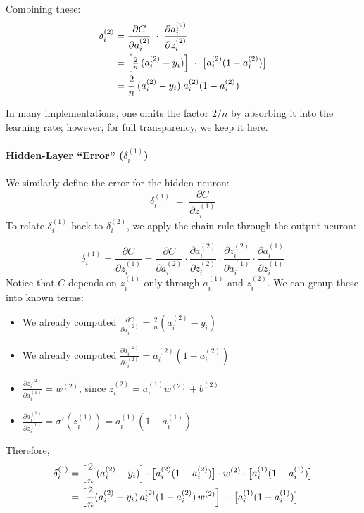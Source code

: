 \documentclass{article}
\begin{document}
\noindent Combining these:
\begin{align}
    \delta_i^{(2)}
    &= \frac{\partial C}{\partial a_i^{(2)}} \;\cdot\; \frac{\partial a_i^{(2)}}{\partial z_i^{(2)}} \\
    &= \Bigl[\tfrac{2}{n}\,(a_i^{(2)} - y_i)\Bigr]\ \cdot\ \bigl[a_i^{(2)}(1 - a_i^{(2)})\bigr] \\
    &= \frac{2}{n}\,(a_i^{(2)} - y_i)\;a_i^{(2)}(1 - a_i^{(2)})
    \label{eq:delta2}
\end{align}

\noindent In many implementations, one omits the factor \(2/n\) by absorbing it into the learning rate; however, for full transparency, we keep it here.

\paragraph{Hidden-Layer ``Error'' (\(\delta_i^{(1)}\))\\}
We similarly define the error for the hidden neuron:
\[
    \delta_i^{(1)} \;=\; \frac{\partial C}{\partial z_i^{(1)}}
\]
To relate \(\delta_i^{(1)}\) back to \(\delta_i^{(2)}\), we apply the chain rule through the output neuron:

\[
    \delta_i^{(1)}
    = \frac{\partial C}{\partial z_i^{(1)}}
    = \frac{\partial C}{\partial a_i^{(2)}} \cdot \frac{\partial a_i^{(2)}}{\partial z_i^{(2)}} \cdot \frac{\partial z_i^{(2)}}{\partial a_i^{(1)}} \cdot \frac{\partial a_i^{(1)}}{\partial z_i^{(1)}}
\]
Notice that \(C\) depends on \(z_i^{(1)}\) only through \(a_i^{(1)}\) and \(z_i^{(2)}\).  We can group these into known terms:

\begin{itemize}
    \item We already computed \(\displaystyle \frac{\partial C}{\partial a_i^{(2)}} = \frac{2}{n}(a_i^{(2)} - y_i)\)
    \item We already computed \(\displaystyle \frac{\partial a_i^{(2)}}{\partial z_i^{(2)}} = a_i^{(2)}(1 - a_i^{(2)})\)
    \item \(\displaystyle \frac{\partial z_i^{(2)}}{\partial a_i^{(1)}} = w^{(2)}\), since \(z_i^{(2)} = a_i^{(1)} w^{(2)} + b^{(2)}\)
    \item \(\displaystyle \frac{\partial a_i^{(1)}}{\partial z_i^{(1)}} = \sigma'(z_i^{(1)}) = a_i^{(1)}(1 - a_i^{(1)})\)
\end{itemize}

\noindent Therefore,
\begin{align}
    \delta_i^{(1)}
    &= \Bigl[\frac{2}{n}\,(a_i^{(2)} - y_i)\Bigr] \cdot \bigl[a_i^{(2)}(1 - a_i^{(2)})\bigr] \cdot w^{(2)} \cdot \bigl[a_i^{(1)}(1 - a_i^{(1)})\bigr] \\
    &= \Bigl[\frac{2}{n}(a_i^{(2)} - y_i)\,a_i^{(2)}(1 - a_i^{(2)})\,w^{(2)}\Bigr]\ \cdot\ \bigl[a_i^{(1)}(1 - a_i^{(1)})\bigr]
    \label{eq:delta1}
\end{align}
\end{document}
